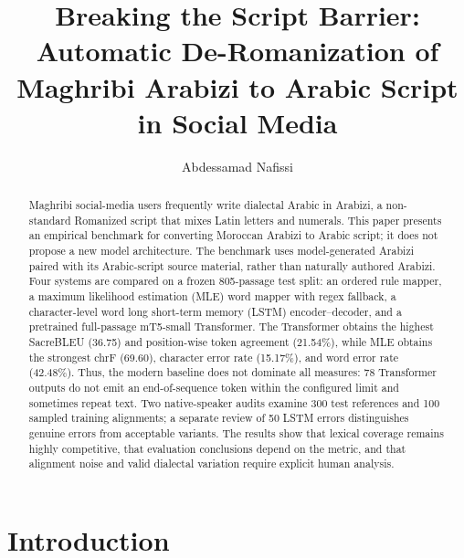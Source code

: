 \documentclass[runningheads]{llncs}
\begin{document}
\title{Breaking the Script Barrier: Automatic De-Romanization of Maghribi Arabizi to Arabic Script in Social Media}

\author{Abdessamad Nafissi}

\maketitle

\begin{abstract}
Maghribi social-media users frequently write dialectal Arabic in Arabizi, a non-standard Romanized script that mixes Latin letters and numerals. This paper presents an empirical benchmark for converting Moroccan Arabizi to Arabic script; it does not propose a new model architecture. The benchmark uses model-generated Arabizi paired with its Arabic-script source material, rather than naturally authored Arabizi. Four systems are compared on a frozen 805-passage test split: an ordered rule mapper, a maximum likelihood estimation (MLE) word mapper with regex fallback, a character-level word long short-term memory (LSTM) encoder--decoder, and a pretrained full-passage mT5-small Transformer. The Transformer obtains the highest SacreBLEU (36.75) and position-wise token agreement (21.54\%), while MLE obtains the strongest chrF (69.60), character error rate (15.17\%), and word error rate (42.48\%). Thus, the modern baseline does not dominate all measures: 78 Transformer outputs do not emit an end-of-sequence token within the configured limit and sometimes repeat text. Two native-speaker audits examine 300 test references and 100 sampled training alignments; a separate review of 50 LSTM errors distinguishes genuine errors from acceptable variants. The results show that lexical coverage remains highly competitive, that evaluation conclusions depend on the metric, and that alignment noise and valid dialectal variation require explicit human analysis.

\end{abstract}

\section{Introduction}
\end{document}
